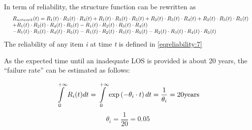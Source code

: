 In term of reliability, the structure function can be rewritten as
\begin{eqnarray}
&& \begin{array}{l}
{R_{network}}(t) = {R_1}(t) \cdot {R_3}(t) \cdot {R_4}(t) + {R_1}(t) \cdot
{R_3}(t) \cdot {R_5}(t) + {R_2}(t) \cdot {R_3}(t) \cdot {R_4}(t) + {R_2}(t) \cdot
{R_3}(t) \cdot {R_5}(t)\\
+ {R_1}(t) \cdot {R_2}(t) \cdot {R_4}(t) \cdot {R_5}(t){\rm{ }} - {R_1}(t)
\cdot {R_2}(t) \cdot {R_3}(t) \cdot {R_4}(t)\\
- {R_1}(t) \cdot {R_3}(t) \cdot {R_4}(t) \cdot {R_5}(t) - {R_1}(t) \cdot
{R_2}(t) \cdot {R_3}(t) \cdot {R_5}(t) - {R_2}(t) \cdot {R_3}(t) \cdot {R_4}(t)
\cdot {R_5}(t)
\end{array}
\label{avaimaineq:5}
\end{eqnarray}
The reliability of any item \textit{i} at time \textit{t} is defined in \eqref{eqreliability:7}

As the expected time until an inadequate LOS is provided is about 20 years, the
``failure rate'' can be estimated as follows:

\[
 \int\limits_0^{ + \infty } {{R_i}(t)} dt = \int\limits_0^{ + \infty } {\exp
\left( { - {\theta _i} \cdot t} \right)dt}  = \frac{1}{{{\theta _i}}} = 20{\rm{
years}}
\]
\[
 {\theta _i} = \frac{1}{{20}} = 0.05
\]

